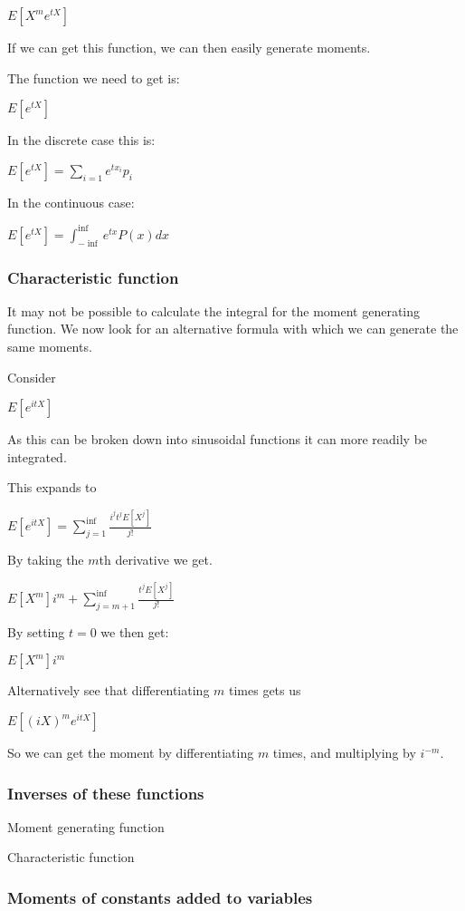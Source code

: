 $E[X^me^{tX}]$

If we can get this function, we can then easily generate moments.

The function we need to get is:

$E[e^{tX}]$

In the discrete case this is:

$E[e^{tX}]=\sum_{i=1}e^{tx_i}p_i$

In the continuous case:

$E[e^{tX}]=\int_{-\inf }^\inf e^{tx}P(x) dx$

\subsubsection{Characteristic function}

It may not be possible to calculate the integral for the moment generating function. We now look for an alternative formula with which we can generate the same moments.

Consider

$E[e^{itX}]$

As this can be broken down into sinusoidal functions it can more readily be integrated.

This expands to

$E[e^{itX}]=\sum_{j=1}^\inf \frac{i^jt^jE[X^j]}{j!}$

By taking the \(m\)th derivative we get.

$E[X^m]i^m+\sum_{j=m+1}^\inf \frac{t^jE[X^j]}{j!}$

By setting \(t=0\) we then get:

$E[X^m]i^m$

Alternatively see that differentiating \(m\) times gets us

$E[(iX)^me^{itX}]$

So we can get the moment by differentiating \(m\) times, and multiplying by \(i^{-m}\).

\subsubsection{Inverses of these functions}

Moment generating function

Characteristic function

\subsubsection{Moments of constants added to variables}

